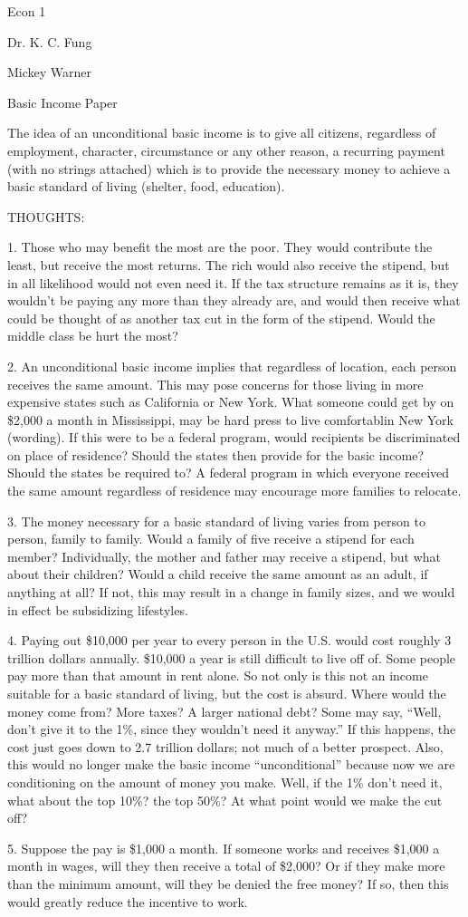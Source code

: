 \documentclass[12pt]{article}
\begin{document}
\noindent Econ 1

\noindent Dr. K. C. Fung
\bigskip

\noindent Mickey Warner

\begin{center}
Basic Income Paper
\end{center}

The idea of an unconditional basic income is to give all citizens, regardless of employment, character, circumstance or any other reason, a recurring payment (with no strings attached) which is to provide the necessary money to achieve a basic standard of living (shelter, food, education).


THOUGHTS:

1. Those who may benefit the most are the poor. They would contribute the least, but receive the most returns. The rich would also receive the stipend, but in all likelihood would not even need it. If the tax structure remains as it is, they wouldn't be paying any more than they already are, and would then receive what could be thought of as another tax cut in the form of the stipend. Would the middle class be hurt the most?

2. An unconditional basic income implies that regardless of location, each person receives the same amount. This may pose concerns for those living in more expensive states such as California or New York. What someone could get by on \$2,000 a month in Mississippi, may be hard press to live comfortablin New York (wording). If this were to be a federal program, would recipients be discriminated on place of residence? Should the states then provide for the basic income? Should the states be required to? A federal program in which everyone received the same amount regardless of residence may encourage more families to relocate.

3. The money necessary for a basic standard of living varies from person to person, family to family. Would a family of five receive a stipend for each member? Individually, the mother and father may receive a stipend, but what about their children? Would a child receive the same amount as an adult, if anything at all? If not, this may result in a change in family sizes, and we would in effect be subsidizing lifestyles.

4. Paying out \$10,000 per year to every person in the U.S. would cost roughly 3 trillion dollars annually. \$10,000 a year is still difficult to live off of. Some people pay more than that amount in rent alone. So not only is this not an income suitable for a basic standard of living, but the cost is absurd. Where would the money come from? More taxes? A larger national debt? Some may say, ``Well, don't give it to the 1\%, since they wouldn't need it anyway.'' If this happens, the cost just goes down to 2.7 trillion dollars; not much of a better prospect. Also, this would no longer make the basic income ``unconditional'' because now we are conditioning on the amount of money you make. Well, if the 1\% don't need it, what about the top 10\%? the top 50\%? At what point would we make the cut off?

5. Suppose the pay is \$1,000 a month. If someone works and receives \$1,000 a month in wages, will they then receive a total of \$2,000? Or if they make more than the minimum amount, will they be denied the free money? If so, then this would greatly reduce the incentive to work.
\end{document}
